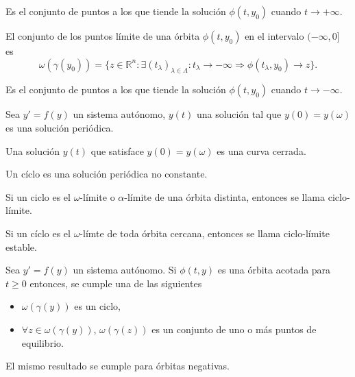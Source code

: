 \begin{obs}
  Es el conjunto de puntos a los que tiende la solución $\phi(t,y_{0})$ cuando $t \rightarrow +\infty$.
\end{obs}

\begin{defn}
  El conjunto de los puntos límite de una órbita $\phi(t, y_{0})$ en el intervalo $(-\infty, 0]$ es
  \[ 
    \omega(\gamma(y_{0})) = \{ z \in \mathbb{R}^{n} : \exists ( t_{\lambda} )_{\lambda \in \Lambda} : t_{\lambda} \rightarrow -\infty \Rightarrow \phi(t_{\lambda}, y_{0}) \rightarrow z \}.
  \] 
\end{defn}
\begin{obs}
  Es el conjunto de puntos a los que tiende la solución $\phi(t,y_{0})$ cuando $t \rightarrow -\infty$.
\end{obs}

\begin{prop}
  Sea $y' = f(y)$ un sistema autónomo, $y(t)$ una solución tal que $y(0) = y(\omega)$ es una solución periódica.
\end{prop}

\begin{obs}
  Una solución $y(t)$ que satisface $y(0) = y(\omega)$ es una curva cerrada.
\end{obs}

\begin{defn}[Cíclo]
  Un cíclo es una solución periódica no constante.
\end{defn}

\begin{defn}
  Si un ciclo es el $\omega$-límite o $\alpha$-límite de una órbita distinta, entonces se llama ciclo-límite.
\end{defn}

\begin{defn}
  Si un cíclo es el $\omega$-límte de toda órbita cercana, entonces se llama ciclo-límite estable.
\end{defn}

\begin{theo}
  Sea $y' = f(y)$ un sistema autónomo. Si $\phi(t,y)$ es una órbita acotada para $t \geq 0$ entonces, se cumple una de las siguientes
  \begin{itemize}
    \item $\omega(\gamma(y))$ es un ciclo,
    \item $\forall z \in \omega(\gamma(y))$, $\omega(\gamma(z))$ es un conjunto de uno o más puntos de equilibrio.   
  \end{itemize}
  El mismo resultado se cumple para órbitas negativas.
\end{theo}

